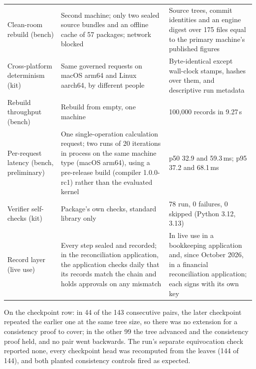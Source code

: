\documentclass[11pt,a4paper]{article}
\begin{document}
\begin{table}[t]
\begin{tabularx}{\linewidth}{@{}>{\raggedright\arraybackslash}p{3.1cm}LL@{}}
Clean-room rebuild (bench) & Second machine; only two sealed source bundles and an offline cache of 57 packages; network blocked & Source trees, commit identities and an engine digest over 175 files equal to the primary machine's published figures \\
Cross-platform determinism (kit) & Same governed requests on macOS arm64 and Linux aarch64, by different people & Byte-identical except wall-clock stamps, hashes over them, and descriptive run metadata \\
Rebuild throughput (bench) & Rebuild from empty, one machine & 100{,}000 records in 9.27\,s \\
Per-request latency (bench, preliminary) & One single-operation calculation request; two runs of 20 iterations in process on the same machine type (macOS arm64), using a pre-release build (compiler 1.0.0-rc1) rather than the evaluated kernel & p50 32.9 and 59.3\,ms; p95 37.2 and 68.1\,ms \\
Verifier self-checks (kit) & Package's own checks, standard library only & 78 run, 0 failures, 0 skipped (Python 3.12, 3.13) \\
Record layer (live use) & Every step sealed and recorded; in the reconciliation application, the application checks daily that its records match the chain and holds approvals on any mismatch & In live use in a bookkeeping application and, since October 2026, in a financial reconciliation application; each signs with its own key \\
\bottomrule
\end{tabularx}
\end{table}

On the checkpoint row: in 44 of the 143 consecutive pairs, the later checkpoint repeated the earlier one at the same tree size, so there was no extension for a consistency proof to cover; in the other 99 the tree advanced and the consistency proof held, and no pair went backwards. The run's separate equivocation check reported none, every checkpoint head was recomputed from the leaves (144 of 144), and both planted consistency controls fired as expected.
\end{document}
